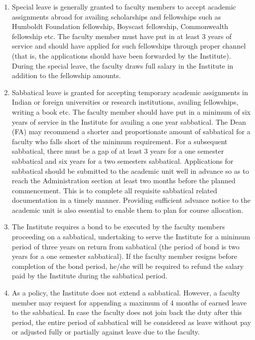 \documentclass[
  10pt,
  a5paper,
  10pt,
  openany]{amsbook}
\providecommand{\tightlist}{%
  \setlength{\itemsep}{0pt}\setlength{\parskip}{0pt}}
\begin{document}
\begin{enumerate}
\def\labelenumi{\arabic{enumi}.}
\tightlist
\item
  Special leave is generally granted to faculty members to accept
  academic assignments abroad for availing scholarships and fellowships
  such as Humboldt Foundation fellowship, Boyscast fellowship,
  Commonwealth fellowship etc. The faculty member must have put in at
  least 3 years of service and should have applied for such fellowships
  through proper channel (that is, the applications should have been
  forwarded by the Institute). During the special leave, the faculty
  draws full salary in the Institute in addition to the fellowship
  amounts.
\item
  Sabbatical leave is granted for accepting temporary academic
  assignments in Indian or foreign universities or research
  institutions, availing fellowships, writing a book etc. The faculty
  member should have put in a minimum of six years of service in the
  Institute for availing a one year sabbatical. The Dean (FA) may
  recommend a shorter and proportionate amount of sabbatical for a
  faculty who falls short of the minimum requirement. For a subsequent
  sabbatical, there must be a gap of at least 3 years for a one semester
  sabbatical and six years for a two semesters sabbatical. Applications
  for sabbatical should be submitted to the academic unit well in
  advance so as to reach the Administration section at least two months
  before the planned commencement. This is to complete all requisite
  sabbatical related documentation in a timely manner. Providing
  sufficient advance notice to the academic unit is also essential to
  enable them to plan for course allocation.
\item
  The Institute requires a bond to be executed by the faculty members
  proceeding on a sabbatical, undertaking to serve the Institute for a
  minimum period of three years on return from sabbatical (the period of
  bond is two years for a one semester sabbatical). If the faculty
  member resigns before completion of the bond period, he/she will be
  required to refund the salary paid by the Institute during the
  sabbatical period.
\item
  As a policy, the Institute does not extend a sabbatical. However, a
  faculty member may request for appending a maximum of 4 months of
  earned leave to the sabbatical. In case the faculty does not join back
  the duty after this period, the entire period of sabbatical will be
  considered as leave without pay or adjusted fully or partially against
  leave due to the faculty.
\end{enumerate}
\end{document}
